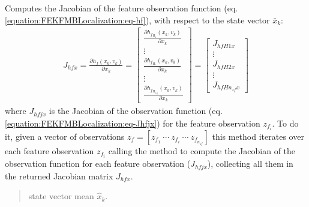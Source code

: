 \documentclass[letterpaper,10pt,english]{sphinxmanual}
\begin{document}
\begin{fulllineitems}
\begin{fulllineitems}
\label{\detokenize{FEKFMBLocalization:MapFeature.MapFeature.Jhfx}}
\pysigstartsignatures
{}
\pysigstopsignatures
\sphinxAtStartPar
Computes the Jacobian of the feature observation function {\hyperref[\detokenize{FEKFMBLocalization:MapFeature.MapFeature.hf}]{}} (eq. \eqref{equation:FEKFMBLocalization:eq-hf}), with respect to the state vector \(\bar{x}_k\):
\begin{equation}\label{equation:FEKFMBLocalization:eq-Jhfx}
\begin{split}J_{hfx}=\frac{\partial h_f(x_k,v_k)}{\partial x_k}=\begin{bmatrix} \frac{\partial h_{f_{H_1}}(x_k,v_k)}{\partial x_k} \\ \vdots \\ \frac{\partial h_{f_{H_i}}(x_k,v_k)}{\partial x_k} \\ \vdots \\ \frac{\partial h_{f_{H_{n_{zf}}}}(x_k,v_k)}{\partial x_k} \end{bmatrix}
=\begin{bmatrix} J_{hfH1x} \\ \vdots \\ J_{hfH2x} \\ \vdots \\ J_{hfHn_{zf}x} \end{bmatrix}\end{split}
\end{equation}
\sphinxAtStartPar
where \(J_{hfjx}\) is the Jacobian of the observation function {\hyperref[\detokenize{FEKFMBLocalization:MapFeature.MapFeature.hfj}]{}} (eq. \eqref{equation:FEKFMBLocalization:eq-Jhfjx}) for the feature observation \(z_{f_i}\).
To do it, given a vector of observations \(z_f=[z_{f_1}~\cdots~z_{f_i}~\cdots~z_{f_{n_{zf}}}]\) this method iterates over each feature observation \(z_{f_i}\) calling the method {\hyperref[\detokenize{FEKFMBLocalization:MapFeature.MapFeature.Jhfjx}]{}} to compute
the Jacobian of the observation function for each feature observation (\(J_{hfjx}\)), collecting all them in the returned Jacobian matrix \(J_{hfx}\).
\begin{quote}\begin{description}
\sphinxAtStartPar
{} \textendash{} state vector mean \(\hat x_k\).


\end{description}
\end{quote}
\end{fulllineitems}
\end{fulllineitems}
\end{document}
